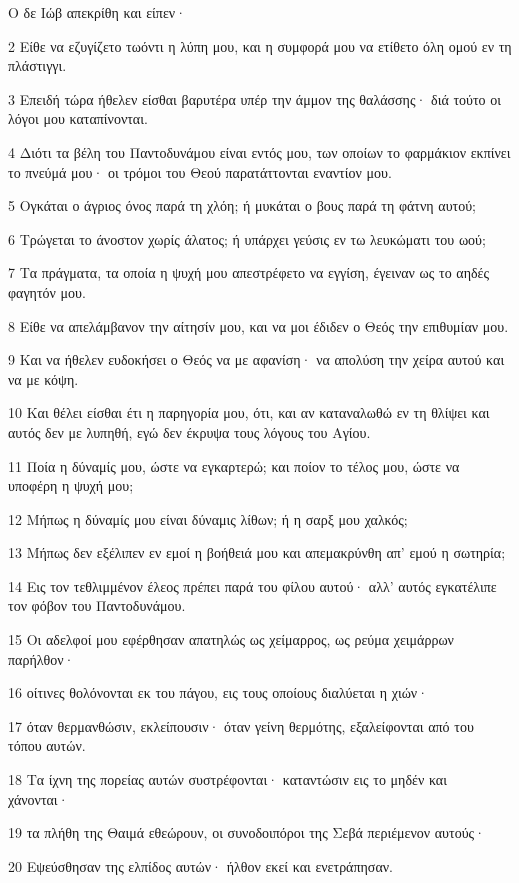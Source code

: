 \par Ο δε Ιώβ απεκρίθη και είπεν·
\par 2 Είθε να εζυγίζετο τωόντι η λύπη μου, και η συμφορά μου να ετίθετο όλη ομού εν τη πλάστιγγι.
\par 3 Επειδή τώρα ήθελεν είσθαι βαρυτέρα υπέρ την άμμον της θαλάσσης· διά τούτο οι λόγοι μου καταπίνονται.
\par 4 Διότι τα βέλη του Παντοδυνάμου είναι εντός μου, των οποίων το φαρμάκιον εκπίνει το πνεύμά μου· οι τρόμοι του Θεού παρατάττονται εναντίον μου.
\par 5 Ογκάται ο άγριος όνος παρά τη χλόη; ή μυκάται ο βους παρά τη φάτνη αυτού;
\par 6 Τρώγεται το άνοστον χωρίς άλατος; ή υπάρχει γεύσις εν τω λευκώματι του ωού;
\par 7 Τα πράγματα, τα οποία η ψυχή μου απεστρέφετο να εγγίση, έγειναν ως το αηδές φαγητόν μου.
\par 8 Είθε να απελάμβανον την αίτησίν μου, και να μοι έδιδεν ο Θεός την επιθυμίαν μου.
\par 9 Και να ήθελεν ευδοκήσει ο Θεός να με αφανίση· να απολύση την χείρα αυτού και να με κόψη.
\par 10 Και θέλει είσθαι έτι η παρηγορία μου, ότι, και αν καταναλωθώ εν τη θλίψει και αυτός δεν με λυπηθή, εγώ δεν έκρυψα τους λόγους του Αγίου.
\par 11 Ποία η δύναμίς μου, ώστε να εγκαρτερώ; και ποίον το τέλος μου, ώστε να υποφέρη η ψυχή μου;
\par 12 Μήπως η δύναμίς μου είναι δύναμις λίθων; ή η σαρξ μου χαλκός;
\par 13 Μήπως δεν εξέλιπεν εν εμοί η βοήθειά μου και απεμακρύνθη απ' εμού η σωτηρία;
\par 14 Εις τον τεθλιμμένον έλεος πρέπει παρά του φίλου αυτού· αλλ' αυτός εγκατέλιπε τον φόβον του Παντοδυνάμου.
\par 15 Οι αδελφοί μου εφέρθησαν απατηλώς ως χείμαρρος, ως ρεύμα χειμάρρων παρήλθον·
\par 16 οίτινες θολόνονται εκ του πάγου, εις τους οποίους διαλύεται η χιών·
\par 17 όταν θερμανθώσιν, εκλείπουσιν· όταν γείνη θερμότης, εξαλείφονται από του τόπου αυτών.
\par 18 Τα ίχνη της πορείας αυτών συστρέφονται· καταντώσιν εις το μηδέν και χάνονται·
\par 19 τα πλήθη της Θαιμά εθεώρουν, οι συνοδοιπόροι της Σεβά περιέμενον αυτούς·
\par 20 Εψεύσθησαν της ελπίδος αυτών· ήλθον εκεί και ενετράπησαν.
